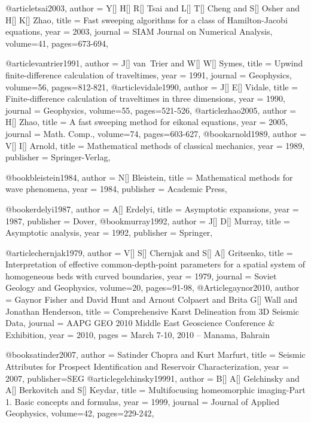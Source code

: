 @article{tsai2003,
  author =	 {Y[] H[] R[] Tsai and L[] T[] Cheng and S[] Osher and H[] K[] Zhao},
  title =	 {Fast sweeping algorithms for a class of Hamilton-Jacobi equations},
  year =	 2003,
  journal =	 {SIAM Journal on Numerical Analysis},
  volume={41},
 pages=673-694,
}

@article{vantrier1991,
  author =	 {J[] van~Trier and W[] W[] Symes},
  title =	 {Upwind finite-difference calculation of traveltimes},
  year =	 1991,
  journal =	 {Geophysics},
  volume={56},
 pages=812-821,
}
@article{vidale1990,
  author =	 {J[] E[] Vidale},
  title =	 {Finite-difference calculation of traveltimes in three dimensions},
  year =	 1990,
  journal =	 {Geophysics},
  volume={55},
 pages=521-526,
}
@article{zhao2005,
  author =	 {H[] Zhao},
  title =	 {A fast sweeping method for eikonal equations},
  year =	 2005,
  journal =	 {Math. Comp.},
  volume={74},
 pages=603-627,
}
@book{arnold1989,
  author =	 {V[] I[] Arnold},
  title =	 {Mathematical methods of classical mechanics},
  year =	 1989,
  publisher =	 {Springer-Verlag},
}

@book{bleistein1984,
  author =	 {N[] Bleistein},
  title =	 {Mathematical methods for wave phenomena},
  year =	 1984,
  publisher =	 {Academic Press},
}

@book{erdelyi1987,
  author =	 {A[] Erdelyi},
  title =	 {Asymptotic expansions},
  year =	 1987,
  publisher =	 {Dover},
}
@book{murray1992,
  author =	 {J[] D[] Murray},
  title =	 {Asymptotic analysis},
  year =	 1992,
  publisher =	 {Springer},
}


@article{chernjak1979,
  author =	 {V[] S[] Chernjak and S[] A[] Gritsenko},
  title =	 {Interpretation of effective common-depth-point parameters for a spatial system of homogeneous beds with curved boundaries},
  year =	 1979,
  journal =	 {Soviet Geology and Geophysics},
  volume={20},
 pages=91-98,
}
@Article{gaynor2010,
  author = 	 {Gaynor Fisher and David Hunt and Arnout Colpaert and Brita G[] Wall and Jonathan Henderson},
  title = 	 {Comprehensive Karst Delineation from 3{D} Seismic Data},
  journal = 	 {AAPG GEO 2010 Middle East Geoscience Conference \& Exhibition},
  year = 	 2010,
  pages = 	 {March 7-10, 2010 – Manama, Bahrain}}

@book{satinder2007,
  author = 	 {Satinder Chopra and Kurt Marfurt},
  title = 	 {Seismic Attributes for Prospect Identification and Reservoir Characterization},
  year = 	 2007,
  publisher={SEG}}
@article{gelchinsky19991,
  author =	 {B[] A[] Gelchinsky and A[] Berkovitch and S[] Keydar},
  title =	 {Multifocusing homeomorphic imaging-Part 1. Basic concepts and formulas},
  year =	 1999,
  journal =	 {Journal of Applied Geophysics},
  volume={42},
 pages=229-242,
}

